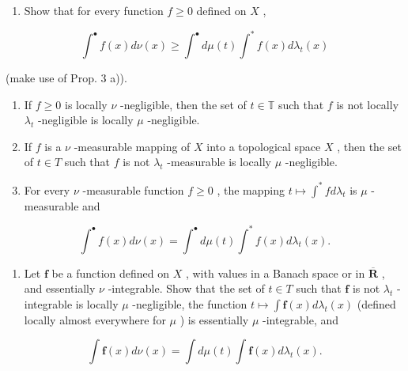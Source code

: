 \begin{enumerate}
\def\labelenumi{\alph{enumi})}
\tightlist
\item
  Show that for every function \(f \geqslant 0\) defined on \(X\) ,
\end{enumerate}

\[
\int^ {\bullet} f (x) d \nu (x) \geqslant \int^ {\bullet} d \mu (t) \int^ {*} f (x) d \lambda_ {t} (x)
\]

(make use of Prop. 3 a)).

\begin{enumerate}
\def\labelenumi{\alph{enumi})}
\setcounter{enumi}{1}
\item
  If \(f \geqslant 0\) is locally \(\nu\) -negligible, then the set of \(t \in \mathbb{T}\) such that \(f\) is not locally \(\lambda_t\) -negligible is locally \(\mu\) -negligible.
\item
  If \(f\) is a \(\nu\) -measurable mapping of \(X\) into a topological space \(X\) , then the set of \(t \in T\) such that \(f\) is not \(\lambda_t\) -measurable is locally \(\mu\) -negligible.
\item
  For every \(\nu\) -measurable function \(f \geqslant 0\) , the mapping \(t \mapsto \int^{*} f d\lambda_{t}\) is \(\mu\) -measurable and
\end{enumerate}

\[
\int^ {\bullet} f (x) d \nu (x) = \int^ {\bullet} d \mu (t) \int^ {*} f (x) d \lambda_ {t} (x).
\]

\begin{enumerate}
\def\labelenumi{\alph{enumi})}
\setcounter{enumi}{4}
\tightlist
\item
  Let \(\mathbf{f}\) be a function defined on \(X\) , with values in a Banach space or in \(\overline{\mathbf{R}}\) , and essentially \(\nu\) -integrable. Show that the set of \(t \in T\) such that \(\mathbf{f}\) is not \(\lambda_t\) -integrable is locally \(\mu\) -negligible, the function \(t \mapsto \int \mathbf{f}(x) d\lambda_t(x)\) (defined locally almost everywhere for \(\mu\) ) is essentially \(\mu\) -integrable, and
\end{enumerate}

\[
\int \mathbf {f} (x) d \nu (x) = \int d \mu (t) \int \mathbf {f} (x) d \lambda_ {t} (x).
\]

\setcounter{exercisegroup}{4}
\edef\CurrentExerciseGroup{\arabic{exercisegroup}}
